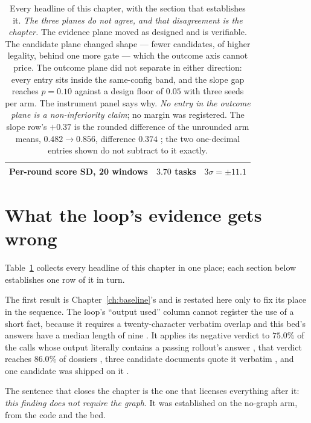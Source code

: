 \begin{table}[t]
\begin{tabular}{@{}lrrl@{}}
Per-round score SD, 20 windows         & \multicolumn{2}{c}{$3.70$ tasks}           & $3\sigma = \pm 11.1$ \F{15} \\
\bottomrule
\end{tabular}
\caption[Results at a glance]{Every headline of this chapter, with the
section that establishes it. \emph{The three planes do not agree, and that
disagreement is the chapter.} The evidence plane moved as designed and is
verifiable. The candidate plane changed shape --- fewer candidates, of
higher legality, behind one more gate --- which the outcome axis cannot
price. The outcome plane did not separate in either direction: every entry
sits inside the same-config band, and the slope gap reaches $p = 0.10$
against a design floor of $0.05$ with three seeds per arm. The instrument
panel says why. \emph{No entry in the outcome plane is a non-inferiority
claim}; no margin was registered. The slope row's $+0.37$ is the rounded
difference of the unrounded arm means, $0.482 \to 0.856$, difference
$0.374$ ; the two one-decimal entries shown do not subtract to it
exactly.}
\label{tab:results}
\end{table}

\section{What the loop's evidence gets wrong}
\label{sec:evidence-wrong}

Table~\ref{tab:results} collects every headline of this chapter in one
place; each section below establishes one row of it in turn.

The first result is Chapter~\ref{ch:baseline}'s and is restated here only
to fix its place in the sequence. The loop's ``output used'' column cannot
register the use of a short fact, because it requires a twenty-character
verbatim overlap and this bed's answers have a median length of nine
. It applies its negative verdict to $75.0\%$ of the calls whose
output literally contains a passing rollout's answer , that verdict
reaches $86.0\%$ of dossiers , three candidate documents quote it
verbatim , and one candidate was shipped on it .

The sentence that closes the chapter is the one that licenses everything
after it: \emph{this finding does not require the graph}. It was
established on the no-graph arm, from the code and the bed.

